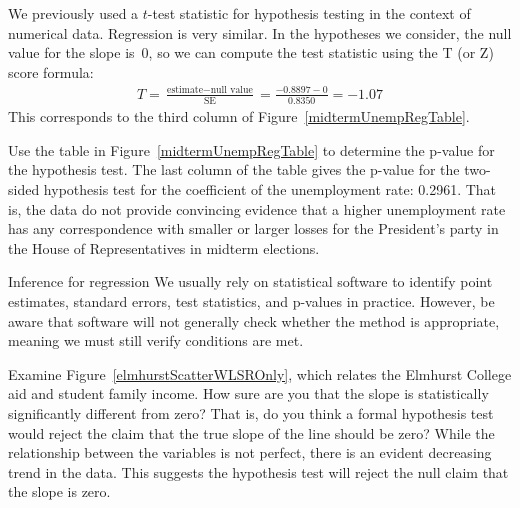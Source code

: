 We previously used a $t$-test statistic for hypothesis testing
in the context of numerical data.
Regression is very similar.
In the hypotheses we consider, the null value for the slope is~0,
so we can compute the test statistic using the T (or Z) score
formula:
\begin{align*}
T
  = \frac{\text{estimate} - \text{null value}}{\text{SE}}
  = \frac{-0.8897 - 0}{0.8350}
  = -1.07
\end{align*}
This corresponds to the third column of
Figure~\ref{midtermUnempRegTable}.


\begin{examplewrap}
\begin{nexample}{Use the table in
    Figure~\ref{midtermUnempRegTable}
    to determine the p-value for the hypothesis test.}
  The last column of the table gives the p-value for
  the two-sided hypothesis test for the coefficient of
  the unemployment rate: 0.2961.
  That is, the data do not provide convincing evidence
  that a higher unemployment rate has any correspondence
  with smaller or larger losses for the President's party
  in the House of Representatives in midterm elections.
\end{nexample}
\end{examplewrap}


\begin{onebox}{Inference for regression}
  We usually rely on statistical software to identify point
  estimates, standard errors, test statistics, and p-values
  in practice.
  However, be aware that software will not generally
  check whether the method is appropriate, meaning we must
  still verify conditions are met.
\end{onebox}

\begin{examplewrap}
\begin{nexample}{Examine Figure~\vref{elmhurstScatterWLSROnly},
    which relates the Elmhurst College aid and student family
    income.
    How sure are you that the slope is statistically
    significantly different from zero?
    That is, do you think a formal hypothesis test would reject
    the claim that the true slope of the line should be zero?}
  \label{overallAidIncomeInfAssessOfRegrLineSlope}%
  While the relationship between the variables is not perfect,
  there is an evident decreasing trend in the data.
  This suggests the hypothesis test will reject the null claim
  that the slope is zero.
\end{nexample}
\end{examplewrap}

